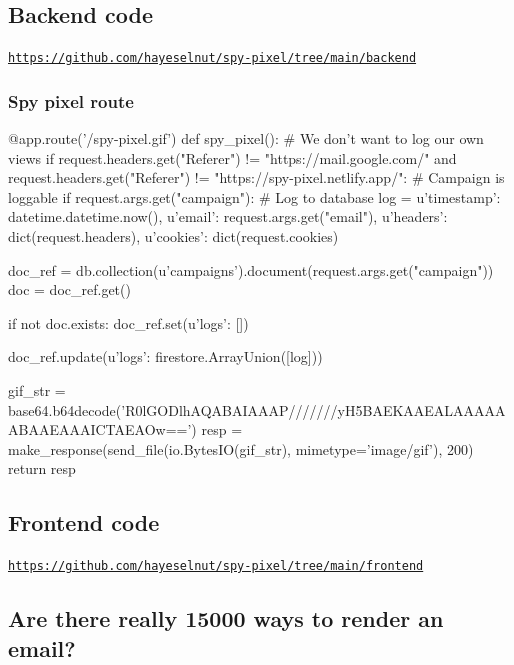 \documentclass{article}
\begin{document}
\subsection{\label{appendix-backend-code}Backend code}

\href{https://github.com/hayeselnut/spy-pixel/tree/main/backend}{\texttt{https://github.com/hayeselnut/spy-pixel/tree/main/backend}}

\subsubsection{Spy pixel route}

\begin{python}
@app.route('/spy-pixel.gif')
def spy_pixel():
    # We don't want to log our own views
    if request.headers.get("Referer") != "https://mail.google.com/" and request.headers.get("Referer") != "https://spy-pixel.netlify.app/":
        # Campaign is loggable
        if request.args.get("campaign"):
            # Log to database
            log = {
                u'timestamp': datetime.datetime.now(),
                u'email': request.args.get("email"),
                u'headers': dict(request.headers),
                u'cookies': dict(request.cookies)
            }

            doc_ref = db.collection(u'campaigns').document(request.args.get("campaign"))
            doc = doc_ref.get()

            if not doc.exists:
                doc_ref.set({u'logs': []})

            doc_ref.update({u'logs': firestore.ArrayUnion([log])})

    gif_str = base64.b64decode('R0lGODlhAQABAIAAAP///////yH5BAEKAAEALAAAAAABAAEAAAICTAEAOw==')
    resp = make_response(send_file(io.BytesIO(gif_str), mimetype='image/gif'), 200)
    return resp
\end{python}

\subsection{\label{appendix-frontend-code}Frontend code}

\href{https://github.com/hayeselnut/spy-pixel/tree/main/frontend}{\texttt{https://github.com/hayeselnut/spy-pixel/tree/main/frontend}}

\subsection{\label{appendix-number-of-ways-to-render-email}Are there really 15000 ways to render an email?}
\end{document}
